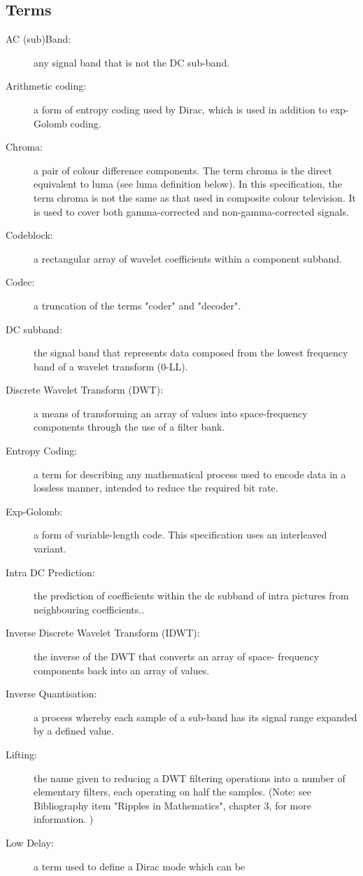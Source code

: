 \subsection{Terms}
\begin{description}
\item[AC (sub)Band:] any signal band that is not the DC sub-band.
\item[Arithmetic coding:] a form of entropy coding used by Dirac, which is used
 in addition to exp-Golomb coding.
\item[Chroma:] a pair of colour difference components. The term chroma is the 
direct equivalent to luma (see luma definition below). In this specification, 
the term chroma is not the same as that used in composite colour television. It 
is used to cover both gamma-corrected and non-gamma-corrected signals.
\item[Codeblock:] a rectangular array of wavelet coefficients within a component
 subband.
\item[Codec:] a truncation of the terms "coder" and "decoder".
\item[DC subband:] the signal band that represents data composed from the lowest
 frequency band of a wavelet transform (0-LL).
\item[Discrete Wavelet Transform (DWT):] a means of transforming an array of 
values into space-frequency components through the use of a filter bank. 
\item[Entropy Coding:] a term for describing any mathematical process used to 
encode data in a lossless manner, intended to reduce the required bit rate.
\item[Exp-Golomb:] a form of variable-length code. This specification uses an 
interleaved variant.
\item[Intra DC Prediction:] the prediction of coefficients within the dc subband
 of intra pictures from neighbouring coefficients..
\item[Inverse Discrete Wavelet Transform (IDWT):] the inverse of the DWT that 
converts an array of space- frequency components back into an array of values.
\item[Inverse Quantisation:] a process whereby each sample of a sub-band has 
its signal range expanded by a defined value.
\item[Lifting:] the name given to reducing a DWT filtering operations into a 
number of elementary
filters, each operating on half the samples.
	(Note: see Bibliography item "Ripples in Mathematics", chapter 3, for 
more information. )
\item[Low Delay:] a term used to define a Dirac mode which can be 

\end{description}
